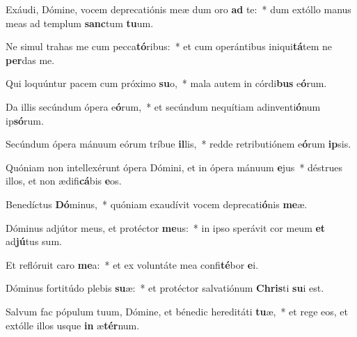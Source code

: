 \item Exáudi, Dómine, vocem deprecatiónis meæ dum oro \textbf{ad} te:~* dum extóllo manus meas ad templum \textbf{sanc}tum \textbf{tu}um.
\item Ne simul trahas me cum pecca\textbf{tó}ribus:~* et cum operántibus iniqui\textbf{tá}tem ne \textbf{per}das me.
\item Qui loquúntur pacem cum próximo \textbf{su}o,~* mala autem in córdi\textbf{bus} e\textbf{ó}rum.
\item Da illis secúndum ópera e\textbf{ó}rum,~* et secúndum nequítiam adinventi\textbf{ó}num ip\textbf{só}rum.
\item Secúndum ópera mánuum eórum tríbue \textbf{il}lis,~* redde retributiónem e\textbf{ó}rum \textbf{ip}sis.
\item Quóniam non intellexérunt ópera Dómini, et in ópera mánuum \textbf{e}jus~* déstrues illos, et non ædifi\textbf{cá}bis \textbf{e}os.
\item Benedíctus \textbf{Dó}minus,~* quóniam exaudívit vocem deprecati\textbf{ó}nis \textbf{me}æ.
\item Dóminus adjútor meus, et protéctor \textbf{me}us:~* in ipso sperávit cor meum \textbf{et} ad\textbf{jú}tus sum.
\item Et reflóruit caro \textbf{me}a:~* et ex voluntáte mea confi\textbf{té}bor \textbf{e}i.
\item Dóminus fortitúdo plebis \textbf{su}æ:~* et protéctor salvatiónum \textbf{Chris}ti \textbf{su}i est.
\item Salvum fac pópulum tuum, Dómine, et bénedic hereditáti \textbf{tu}æ,~* et rege eos, et extólle illos usque \textbf{in} æ\textbf{tér}num.
